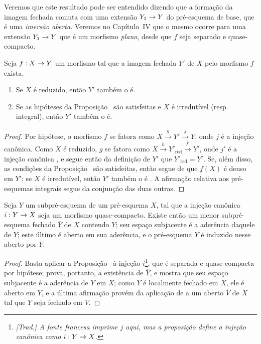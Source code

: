 \documentclass[oneside]{amsart}
\makeatletter
\newcommand{\ega@arrow}[2]{\mathchoice{#1}{#2}{#2}{#2}}
\renewcommand{\to}{\ega@arrow{\longrightarrow}{\rightarrow}}
\let\EGAOriginalLabel\label
\renewcommand{\label}[1]{\phantomsection\EGAOriginalLabel{#1}}
\makeatother
\begin{document}
Veremos que este resultado pode ser entendido dizendo que a formação da imagem fechada comuta com uma extensão $Y_1\to Y$ do pré-esquema de base, que é uma \emph{imersão aberta}.
Veremos no Capítulo~IV que o mesmo ocorre para uma extensão $Y_1\to Y$ que é um morfismo \emph{plano}, desde que $f$ seja separado e quase-compacto.

\begin{proposition}[9.5.9]
\label{I.9.5.9}
Seja $f:X\to Y$ um morfismo tal que a imagem fechada $Y'$ de $X$ pelo morfismo $f$ exista.
\begin{enumerate}
  \item[{\rm(i)}] Se $X$ é reduzido, então $Y'$ também o é.
  \item[{\rm(ii)}] Se as hipóteses da Proposição~ são satisfeitas e $X$ é irredutível (resp. integral), então $Y'$ também o é.
\end{enumerate}
\end{proposition}

\begin{proof}
Por hipótese, o morfismo $f$ se fatora como $X\xrightarrow{g}Y'\xrightarrow{j}Y$, onde $j$ é a injeção canônica.
Como $X$ é reduzido, $g$ se fatora como $X\xrightarrow{h}Y'_{\mathrm{red}}\xrightarrow{j'}Y'$, onde $j'$ é a injeção canônica , e segue então da definição de $Y'$ que $Y'_{\mathrm{red}}=Y'$.
Se, além disso, as condições da Proposição~ são satisfeitas, então segue de  que $f(X)$ é denso em $Y'$; se $X$ é irredutível, então $Y'$ também o é .
A afirmação relativa aos pré-esquemas integrais segue da conjunção das duas outras.
\end{proof}

\begin{proposition}[9.5.10]
\label{I.9.5.10}
Seja $Y$ um subpré-esquema de um pré-esquema $X$, tal que a injeção canônica $i:Y\to X$ seja um morfismo quase-compacto.
Existe então um menor subpré-esquema fechado $\overline{Y}$ de $X$ contendo $Y$; seu espaço subjacente é a aderência daquele de $Y$; este último é aberto em sua aderência, e o pré-esquema $Y$ é induzido nesse aberto por $\overline{Y}$.
\end{proposition}

\begin{proof}
Basta aplicar a Proposição~ à injeção $i$\footnote{\emph{[Trad.] A fonte francesa imprime $j$ aqui, mas a proposição define a injeção canônica como $i:Y\to X$.}}, que é separada  e quase-compacta por hipótese;  prova, portanto, a existência de $\overline{Y}$, e  mostra que seu espaço subjacente é a aderência de $Y$ em $X$; como $Y$ é localmente fechado em $X$, ele é aberto em $\overline{Y}$, e a última afirmação provém da aplicação de  a um aberto $V$ de $X$ tal que $Y$ seja fechado em $V$.
\end{proof}
\end{document}
